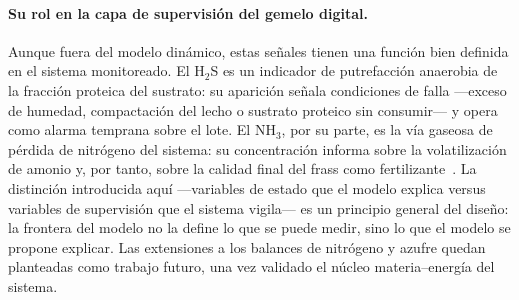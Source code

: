 \paragraph{Su rol en la capa de supervisi\'on del gemelo digital.} Aunque fuera del modelo din\'amico, estas se\~nales tienen una funci\'on bien definida en el sistema monitoreado. El H$_2$S es un indicador de putrefacci\'on anaerobia de la fracci\'on proteica del sustrato: su aparici\'on se\~nala condiciones de falla ---exceso de humedad, compactaci\'on del lecho o sustrato proteico sin consumir--- y opera como alarma temprana sobre el lote. El NH$_3$, por su parte, es la v\'ia gaseosa de p\'erdida de nitr\'ogeno del sistema: su concentraci\'on informa sobre la volatilizaci\'on de amonio y, por tanto, sobre la calidad final del frass como fertilizante~\citep{parodiBioconversionEfficienciesGreenhouse2020a}. La distinci\'on introducida aqu\'i ---variables de estado que el modelo explica versus variables de supervisi\'on que el sistema vigila--- es un principio general del dise\~no: la frontera del modelo no la define lo que se puede medir, sino lo que el modelo se propone explicar. Las extensiones a los balances de nitr\'ogeno y azufre quedan planteadas como trabajo futuro, una vez validado el n\'ucleo materia--energ\'ia del sistema.